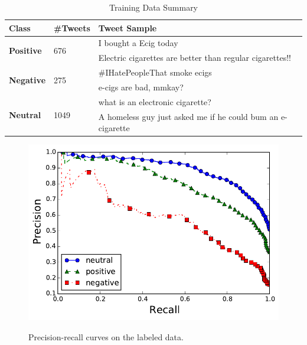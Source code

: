 \documentclass{sig-alternate}
\begin{document}
\begin{table}[t]
\centering
\caption{Training Data Summary}
\label{tab:labelsample}
\begin{tabular}{|l|l|p{9cm}|}
\hline
{\bf Class}                     & {\bf \#Tweets}        & {\bf Tweet Sample}                                                                                                                       \\ \hline
\multirow{2}{*}{{\bf Positive}} & \multirow{2}{*}{676}  & I bought a Ecig today                                                                                                                    \\ %
                                &                       & Electric cigarettes are better than regular cigarettes!!                                          \\ \hline
\multirow{2}{*}{{\bf Negative}} & \multirow{2}{*}{275}  & \#IHatePeopleThat smoke ecigs                                                  \\ %
                                &                       & e-cigs are bad, mmkay?                                                                                                         \\ \hline
\multirow{2}{*}{{\bf Neutral}}  & \multirow{2}{*}{1049} &  what is an electronic cigarette?        \\ %
                                &                       & A homeless guy just asked me if he could bum an e-cigarette\\ \hline
\end{tabular}
\end{table}

\begin{figure}[t]
\caption{Precision-recall curves on the labeled data.}
\includegraphics[width=\columnwidth]{nb/prec_rec.pdf}  %
\centering
\label{f.prec_rec}
\end{figure}
\end{document}
